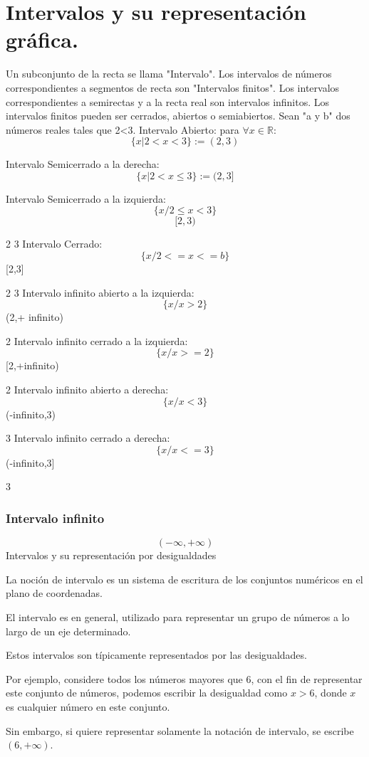 \documentclass[oneside,spanish,letterpaper]{extbook}
\theoremstyle{mythmstyle}
\begin{document}
\cite{AxiR}

\section{Intervalos y su representación gráfica.}
Un subconjunto de la recta se llama "Intervalo".
Los intervalos de números correspondientes a segmentos de recta son
"Intervalos finitos".
Los intervalos correspondientes a semirectas y a la recta real son intervalos infinitos.
Los intervalos finitos pueden ser cerrados, abiertos o semiabiertos.
Sean "a y b" dos números reales tales que 2<3.
Intervalo Abierto:
para $\forall x\in \mathbb{R}$:
$$\{x|2<x<3\}:=(2,3)$$



Intervalo Semicerrado a la derecha:
$$\{x|2<x\leq 3\}:=(2,3]$$




Intervalo Semicerrado a la izquierda:
$$\{x/2\leq x<3\}$$
$$[2,3)$$


2 3
Intervalo Cerrado:
$$\{x/2<=x<=b\}$$
[2,3]

2 3
Intervalo infinito abierto a la izquierda:
$$\{x/x>2\}$$
(2,+ infinito)

2
Intervalo infinito cerrado a la izquierda:
$$\{x/x>=2\}$$
[2,+infinito)

2
Intervalo infinito abierto a derecha:
$$\{x/x<3\}$$
(-infinito,3)

3
Intervalo infinito cerrado a derecha:
$$\{x/x<=3\}$$
(-infinito,3]


3
\cite{cd7}

\subsubsection{Intervalo infinito} 
$$(-\infty,+\infty)$$
Intervalos y su representación por desigualdades

La noción de intervalo es un sistema de escritura de los conjuntos numéricos en el plano de coordenadas.

El intervalo es en general, utilizado para representar un grupo de números a lo largo de un eje determinado.

Estos intervalos son típicamente representados por las desigualdades.

Por ejemplo, considere todos los números mayores que 6, con el fin de representar este conjunto de números,
podemos escribir la desigualdad como $x> 6$, donde $x$ es cualquier número en este conjunto.

Sin embargo, si quiere representar solamente la notación de intervalo, se escribe $(6, +\infty )$.
\end{document}
